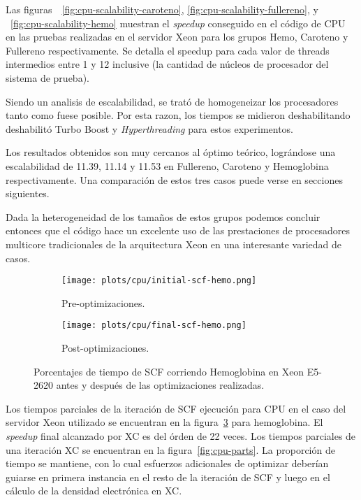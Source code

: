 Las figuras~~\ref{fig:cpu-scalability-caroteno}, \ref{fig:cpu-scalability-fullereno}, y
~\ref{fig:cpu-scalability-hemo} muestran el \textit{speedup} conseguido en
el c\'odigo de CPU en las pruebas realizadas en el servidor Xeon para los grupos
Hemo, Caroteno y Fullereno respectivamente. Se detalla el speedup para cada
valor de threads intermedios entre 1 y 12 inclusive (la cantidad de núcleos de
procesador del sistema de prueba).

Siendo un analisis de escalabilidad, se trat\'o de homogeneizar los procesadores
tanto como fuese posible. Por esta razon, los tiempos se midieron deshabilitando
deshabilit\'o Turbo Boost y \textit{Hyperthreading} para estos experimentos.

Los resultados obtenidos son muy cercanos al \'optimo te\'orico, logr\'andose una escalabilidad de 11.39,
11.14 y 11.53 en Fullereno, Caroteno y Hemoglobina respectivamente. Una comparaci\'on
de estos tres casos puede verse en secciones siguientes.

Dada la heterogeneidad de los tama\~nos de estos grupos podemos concluir entonces que el c\'odigo
hace un excelente uso de las prestaciones de procesadores multicore tradicionales
de la arquitectura Xeon en una interesante variedad de casos.

\begin{figure}[htbp]
\centering
\begin{subfigure}[b]{\plotwidthtres}
   \texttt{[image: plots/cpu/initial-scf-hemo.png]}
   \caption{Pre-optimizaciones.}
   \label{fig:initial-cpu-scf}
 \end{subfigure}
 \begin{subfigure}[b]{\plotwidthtres}
   \texttt{[image: plots/cpu/final-scf-hemo.png]}
   \caption{Post-optimizaciones.}
   \label{fig:final-cpu-scf}
 \end{subfigure}
 \caption{Porcentajes de tiempo de SCF corriendo Hemoglobina en Xeon E5-2620 antes y despu\'es de
 las optimizaciones realizadas.}
 \label{fig:cpu-scf}
\end{figure}

Los tiempos parciales de la iteraci\'on de SCF ejecuci\'on para CPU en el caso del servidor Xeon
utilizado se encuentran en la figura~\ref{fig:cpu-scf} para hemoglobina. El \textit{speedup} final alcanzado por XC es del
\'orden de 22 veces.
Los tiempos parciales de una iteraci\'on XC se encuentran en la figura~\ref{fig:cpu-parts}. La
proporci\'on de tiempo se mantiene, con lo cual esfuerzos adicionales de optimizar deber\'ian
guiarse en primera instancia en el resto de la iteraci\'on de SCF y luego en el c\'alculo de
la densidad electr\'onica en XC.

